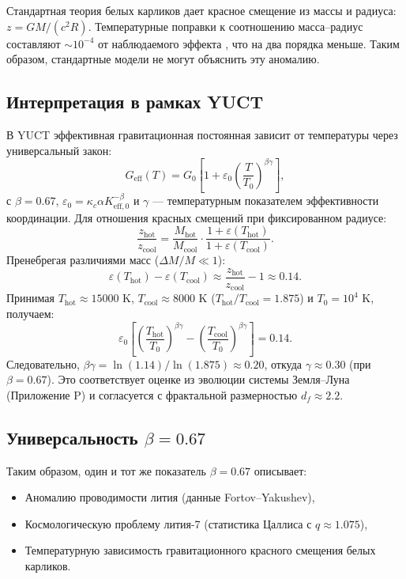 \documentclass[12pt,a4paper]{article}
\theoremstyle{remark}
\newcommand{\df}{d_{\!f}}
\newcommand{\kappac}{\kappa_c}
\newcommand{\alp}{\alpha}
\newcommand{\eps}{\varepsilon}
\begin{document}
	Стандартная теория белых карликов дает красное смещение из массы и радиуса: \(z = GM/(c^2 R)\). Температурные поправки к соотношению масса–радиус составляют \(\sim 10^{-4}\) от наблюдаемого эффекта \cite{Fontaine2001}, что на два порядка меньше. Таким образом, стандартные модели не могут объяснить эту аномалию.
	
	\subsection{Интерпретация в рамках YUCT}
	\label{subsec:wd-yuct-interp}
	
	В YUCT эффективная гравитационная постоянная зависит от температуры через универсальный закон:
	\[
	G_{\mathrm{eff}}(T) = G_0\left[1 + \eps_0 \left(\frac{T}{T_0}\right)^{\beta\gamma}\right],
	\]
	с \(\beta = 0.67\), \(\eps_0 = \kappac \alp K_{\mathrm{eff},0}^{-\beta}\) и \(\gamma\) — температурным показателем эффективности координации. Для отношения красных смещений при фиксированном радиусе:
	\[
	\frac{z_{\mathrm{hot}}}{z_{\mathrm{cool}}} = \frac{M_{\mathrm{hot}}}{M_{\mathrm{cool}}} \cdot \frac{1 + \eps(T_{\mathrm{hot}})}{1 + \eps(T_{\mathrm{cool}})}.
	\]
	Пренебрегая различиями масс (\(\Delta M/M \ll 1\)):
	\[
	\eps(T_{\mathrm{hot}}) - \eps(T_{\mathrm{cool}}) \approx \frac{z_{\mathrm{hot}}}{z_{\mathrm{cool}}} - 1 \approx 0.14.
	\]
	Принимая \(T_{\mathrm{hot}} \approx 15000\) K, \(T_{\mathrm{cool}} \approx 8000\) K (\(T_{\mathrm{hot}}/T_{\mathrm{cool}} = 1.875\)) и \(T_0 = 10^4\) K, получаем:
	\[
	\eps_0 \left[\left(\frac{T_{\mathrm{hot}}}{T_0}\right)^{\beta\gamma} - \left(\frac{T_{\mathrm{cool}}}{T_0}\right)^{\beta\gamma}\right] = 0.14.
	\]
	Следовательно, \(\beta\gamma = \ln(1.14)/\ln(1.875) \approx 0.20\), откуда \(\gamma \approx 0.30\) (при \(\beta = 0.67\)). Это соответствует оценке из эволюции системы Земля–Луна \cite{Lantink2022, Farhat2022} (Приложение P) и согласуется с фрактальной размерностью \(\df \approx 2.2\).
	
	\subsection{Универсальность \(\beta = 0.67\)}
	\label{subsec:beta-universality}
	
	Таким образом, один и тот же показатель \(\beta = 0.67\) описывает:
	\begin{itemize}
		\item Аномалию проводимости лития (данные Fortov–Yakushev),
		\item Космологическую проблему лития-7 (статистика Цаллиса с \(q \approx 1.075\)),
		\item Температурную зависимость гравитационного красного смещения белых карликов.
	\end{itemize}
	
\end{document}
